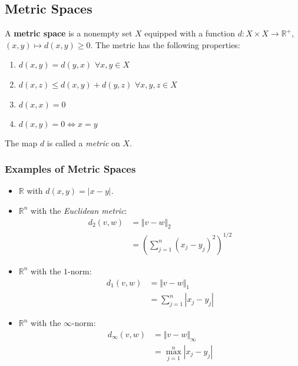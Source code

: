 \documentclass[10pt]{extarticle}
\newcommand{\R}{\mathbb{R}}
\begin{document}
  \subsection{Metric Spaces}%
    A \textbf{metric space} is a nonempty set $X$ equipped with a function $d: X\times X \rightarrow \R^+$, $(x,y)\mapsto d(x,y) \geq 0$. The metric has the following properties:
    \begin{enumerate}[(1)]
      \item $d(x,y) = d(y,x)$ $\forall x,y\in X$
      \item $d(x,z) \leq d(x,y) + d(y,z)$ $\forall x,y,z\in X$
      \item $d(x,x) = 0$
      \item $d(x,y) = 0 \Leftrightarrow x=y$
    \end{enumerate}
    The map $d$ is called a \textsl{metric} on $X$.\\

    \subsubsection{Examples of Metric Spaces}%
    \begin{itemize}
      \item $\R$ with $d(x,y) = |x-y|$.
      \item $\R^n$ with the \textsl{Euclidean metric}:
        \begin{align*}
          d_2(v,w) &= \Vert v - w \Vert_2\\
                   &= \left(\sum_{j=1}^{n}(x_j-y_j)^2\right)^{1/2}
        \end{align*}
      \item $\R^n$ with the $1$-norm:
        \begin{align*}
          d_1(v,w) &= \Vert v-w\Vert_1\\
                   &= \sum_{j=1}^{n} |x_j-y_j|
        \end{align*}
      \item $\R^n$ with the $\infty$-norm:
        \begin{align*}
          d_{\infty}(v,w) &= \Vert v-w\Vert_{\infty}\\
                          &= \max_{j=1}^{n} |x_j-y_j|
        \end{align*}
    \end{itemize}
\end{document}
